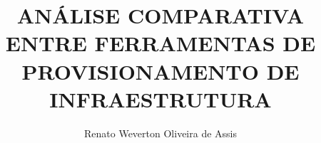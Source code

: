 \newcommand{\monog}{%
\uppercase{Análise Comparativa entre ferramentas de provisionamento de infraestrutura}
}
\title{\monog}
\newcommand{\por}{%
Renato Weverton Oliveira de Assis
}
\author{\por}

\newcommand{\subtitulo}{infraestrutura como código}

\newcommand{\univ}{\hspace{0.1cm}Pontifícia \hspace{0.1cm}Universidade\hspace{0.1cm} Católica \hspace{0.1cm}de\hspace{0.2cm} Minas\hspace{0.2cm} Gerais}

\newcommand{\curso}{\hspace{0.1cm} Programa \hspace{0.1cm} de \hspace{0.1cm} graduação\hspace{0.1cm} em \hspace{0.1cm} Sistema de Informação}

\newcommand{\grau}{Bacharel em Sistema de Informação}
\newcommand{\tipo}{Monografia }

\newcommand{\profOrientador}{Profª. Rosilane Ribeiro da Mota}
\newcommand{\profA}{Prof. Nome do Avaliador}
\newcommand{\profB}{Prof. Nome do Avaliador}

\newcommand{\areaConcentracao}{Inteligência Computacional e Sistemas Distribuídos}

\newcommand{\cidade}{Belo Horizonte}

\newcommand{\ano}{2019}

\newcommand{\dataCompleta}{12 Dezembro de \ano}

